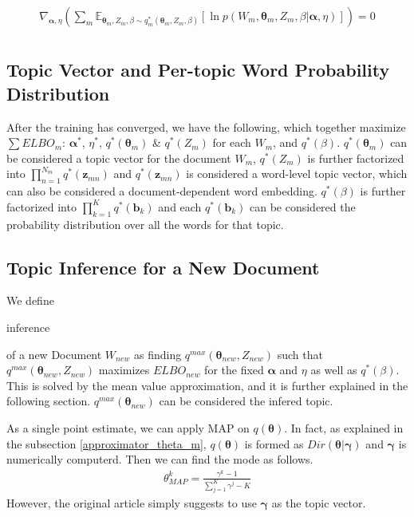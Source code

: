 \documentclass[a4]{article}
\begin{document}
\begin{equation}
\begin{aligned}
\nabla_{\bm{\alpha}, \eta} \left( \sum_m
\mathbb{E}_{\bm{\theta}_m, Z_m, \beta \sim q^*_m(\bm{\theta}_m, Z_m, \beta)}
[\ln p( W_m, \bm{\theta}_m, Z_m, \beta | \bm{\alpha}, \eta ) ]\label{derivative_M_step}\right) = 0\\
\end{aligned}
\end{equation}

\subsection{Topic Vector and Per-topic Word Probability Distribution}
After the training has converged, we have the following, which together maximize $\sum ELBO_m$:
$\bm{\alpha}^*$, $\eta^*$, $q^*(\bm{\theta}_m)$ \& $q^*(Z_m)$ for each $W_m$, and $q^*(\beta)$.
$q^*(\bm{\theta}_m)$ can be considered a topic vector for the document $W_m$, 
$q^*(Z_m)$ is further factorized into $\prod_{n=1}^{N_m} q^*(\mathbf{z}_{mn})$ and 
$q^*(\mathbf{z}_{mn})$ is considered a word-level topic vector, which can also be considered a 
document-dependent word embedding.
$q^*(\beta)$ is further factorized into $\prod_{k=1}^{K} q^*(\mathbf{b}_{k})$ and each 
$q^*(\mathbf{b}_{k})$ can be considered the probability distribution over all the words for that topic.

\subsection{Topic Inference for a New Document}
We define \begin{bf}inference\end{bf} of a new Document $W_{new}$ as finding $q^{max}(\bm{\theta}_{new}, Z_{new})$ such
that $q^{max}(\bm{\theta}_{new}, Z_{new})$ maximizes $ELBO_{new}$ for the fixed $\bm{\alpha}$ and $\eta$ as well as 
$q^*(\beta)$. This is solved by the mean value approximation, and it is further explained in the following section.
$q^{max}(\bm{\theta}_{new})$ can be considered the infered topic.

As a single point estimate, we can apply MAP on $q(\bm{\theta})$.
In fact, as explained in the subsection \ref{approximator_theta_m},
$q(\bm{\theta})$ is formed as $Dir( \bm{\theta} | \bm{\gamma} )$ and 
$\bm{\gamma}$ is numerically computerd. Then we can find the mode as follows.
\begin{equation}
\begin{aligned}
\theta_{MAP}^k = \frac{\gamma^k - 1}{\sum_{j=1}^K \gamma^j - K  }
\end{aligned}
\end{equation}
However, the original article \cite{NIPS2001_2070} simply suggests to use $\bm{\gamma}$ as the topic vector.
\end{document}

